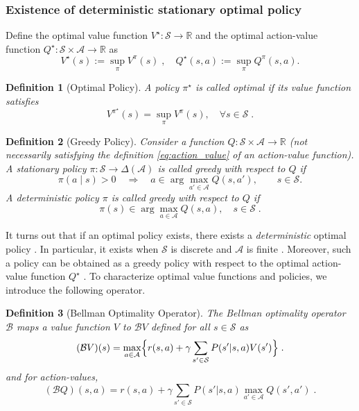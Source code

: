 \documentclass{article}
\numberwithin{equation}{section}
\newtheorem{definition}{Definition}
\newcommand{\R}{\mathbb{R}}
\newcommand{\cA}{\mathcal{A}}
\newcommand{\cS}{\mathcal{S}}
\newcommand{\eqsp}{\;}
\begin{document}
\subsubsection{Existence of deterministic stationary optimal policy}
Define the optimal value
function $V^\star:\cS\to \R$
and the optimal action-value function $Q^\star:\cS\times\cA \to \R$
as 
\begin{equation}
    V^{\star}(s) :=\sup_{\pi} V^\pi(s)\eqsp, \quad Q^{\star}(s, a)  :=\sup_{\pi} Q^\pi(s, a).
\end{equation}
\begin{definition}[Optimal Policy]
A policy $\pi^{\star}$ is called \emph{optimal} if its value function satisfies
\[
V^{\pi^{\star}}(s) = \sup_{\pi} V^{\pi}(s), \quad \forall s \in \mathcal{S}\eqsp.
\]
\end{definition}
\begin{definition}[Greedy Policy]
    Consider a function $Q:\cS\times\cA \to \R$ (not necessarily satisfying the definition \eqref{eq:action_value} of an action-value function).
    A stationary policy \(\pi:\cS\to\Delta(\cA)\) is called \emph{greedy} with respect to \(Q\) if
\[
\pi(a\mid s)>0 \quad\Rightarrow\quad a\in\arg\max_{a'\in\cA}Q(s,a'),
\qquad s\in\cS.
\]
    A deterministic policy $\pi$ is called \emph{greedy} with respect to $Q$
    if
    \begin{equation*}
        \pi(s) \in \arg\max_{a\in\cA} Q(s, a),\quad s\in\cS\eqsp.
    \end{equation*}
\end{definition}
It turns out that if an optimal policy exists, there exists a \emph{deterministic} optimal policy \cite[Theorem 6.2.9]{putermanMDP}.
In particular, it exists when \(\cS\) is discrete and \(\cA\) is finite \cite[Theorem 6.2.10]{putermanMDP}.
Moreover, such a policy can be obtained as a greedy policy with respect to the optimal action-value function \(Q^\star\) \cite[Corollary 6.2.8]{putermanMDP}. To characterize optimal value functions and policies, we introduce the following operator.

\begin{definition}[Bellman Optimality Operator]
    The \emph{Bellman optimality operator} $\mathcal{B}$ maps a value function $V$ to $\mathcal{B}V$ defined for all \(s\in\cS\) as
    \begin{equation}\label{eq:backup}
    (\mathcal{B}V)(s) = \max_{a\in\cA} \Bigl\{ r(s, a) + \gamma \sum_{s'\in\cS} P(s'|s,a) V(s') \Bigr\}\eqsp.
\end{equation}
   and for action-values,
\begin{equation}\label{eq:bellman_operator}
(\mathcal{B} Q)(s,a) = r(s,a) + \gamma \sum_{s'\in\mathcal{S}} P(s'|s,a) \max_{a'\in\mathcal{A}} Q(s',a')\eqsp.
\end{equation}
\end{definition}
\end{document}
